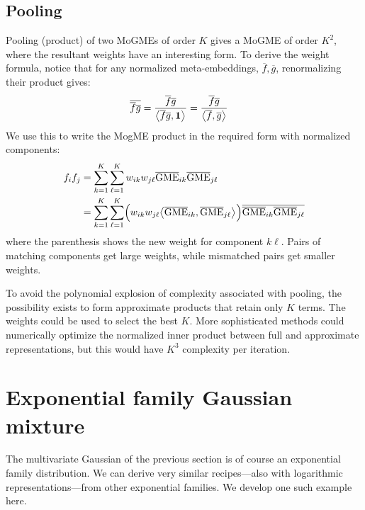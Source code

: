 \documentclass[a4paper,oneside,12pt,english]{report}
\def\expv#1#2{\bigl\langle#1\bigr\rangle_{#2}}
\def\dot#1#2{\expv{#1,#2}{}}
\def\normal#1{\overline{#1}}
\def\dotn#1#2{\dot{\normal{#1}}{\normal{#2}}}
\begin{document}
\subsection{Pooling}
Pooling (product) of two MoGMEs of order $K$ gives a MoGME of order $K^2$, where the resultant weights have an interesting form. To derive the weight formula, notice that for any normalized meta-embeddings, $\normal{f},\normal{g}$, renormalizing their product gives:
\begin{align}
\normal{\normal{f}\normal{g}} &=  \frac{\normal{f}\normal{g}}{\dot{\normal{f}\normal{g}}{\onevec}} = \frac{\normal{f}\normal{g}}{\dotn{f}{g}}
\end{align}  
We use this to write the MogME product in the required form with normalized components:
\begin{align}
\begin{split}
f_if_j &= \sum_{k=1}^K\sum_{\ell=1}^K w_{ik}w_{j\ell} \nGME_{ik}\nGME_{j\ell} \\
&= \sum_{k=1}^K\sum_{\ell=1}^K \Bigl(w_{ik}w_{j\ell} \dot{\nGME_{ik}}{\nGME_{j\ell}}\Bigr)\normal{\nGME_{ik}\nGME_{j\ell}} \\
\end{split}
\end{align}
where the parenthesis shows the new weight for component $k\ell$. Pairs of matching components get large weights, while mismatched pairs get smaller weights.

To avoid the polynomial explosion of complexity associated with pooling, the possibility exists to form approximate products that retain only $K$ terms. The weights could be used to select the best $K$. More sophisticated methods could numerically optimize the normalized inner product between full and approximate representations, but this would have $K^3$ complexity per iteration. 



\section{Exponential family Gaussian mixture}
The multivariate Gaussian of the previous section is of course an exponential family distribution. We can derive very similar recipes---also with logarithmic representations---from other exponential families. We develop one such example here.
\end{document}
